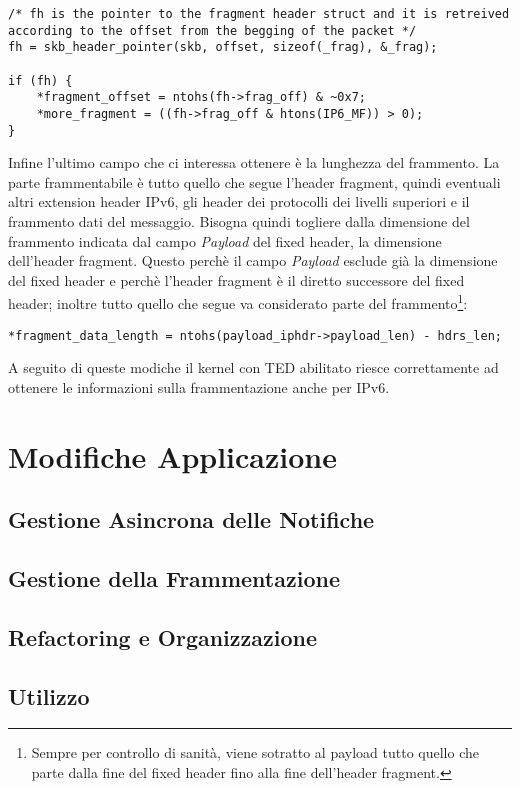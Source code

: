 \documentclass[a4paper,10pt]{article}
\begin{document}
\begin{lstlisting}
/* fh is the pointer to the fragment header struct and it is retreived
according to the offset from the begging of the packet */
fh = skb_header_pointer(skb, offset, sizeof(_frag), &_frag);

if (fh) {
	*fragment_offset = ntohs(fh->frag_off) & ~0x7;
	*more_fragment = ((fh->frag_off & htons(IP6_MF)) > 0);
} 
\end{lstlisting}
 
Infine l'ultimo campo che ci interessa ottenere è la lunghezza del
frammento. La parte frammentabile è tutto quello che segue l'header
fragment, quindi eventuali altri extension header IPv6, gli header dei
protocolli dei livelli superiori e il frammento dati del messaggio.
Bisogna quindi togliere dalla dimensione del frammento indicata dal
campo \emph{Payload} del fixed header, la dimensione dell'header fragment.
Questo perchè il campo \emph{Payload} esclude già la dimensione del fixed
header e perchè l'header fragment è il diretto successore del fixed
header; inoltre tutto quello che segue va considerato parte del
frammento\footnote{Sempre per controllo di sanità, viene sotratto al
payload
tutto quello che parte dalla fine del fixed header fino alla fine
dell'header fragment.}:

\begin{lstlisting}
*fragment_data_length = ntohs(payload_iphdr->payload_len) - hdrs_len;
\end{lstlisting}

A seguito di queste modiche il kernel con TED abilitato riesce
correttamente ad ottenere le informazioni sulla frammentazione anche per
IPv6.

\section{Modifiche Applicazione}
\label{sec:app}
\subsection{Gestione Asincrona delle Notifiche}

\subsection{Gestione della Frammentazione}

\subsection{Refactoring e Organizzazione}

\subsection{Utilizzo}
\end{document}
